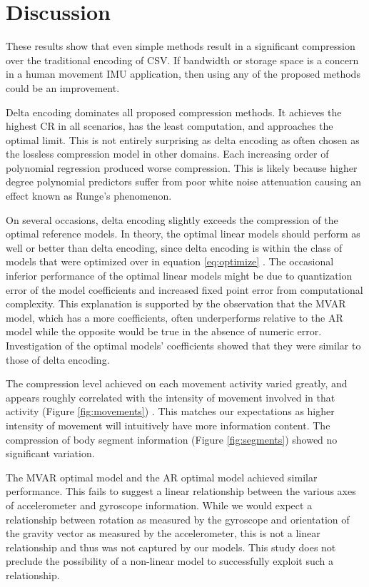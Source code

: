 \documentclass[journal]{IEEEtran}
\begin{document}
\section{Discussion}

These results show that even simple methods result in a significant compression over the traditional encoding of CSV. If bandwidth or storage space is a concern in a human movement IMU application, then using any of the proposed methods could be an improvement.

Delta encoding dominates all proposed compression methods. It achieves the highest CR in all scenarios, has the least computation, and approaches the optimal limit. This is not entirely surprising as delta encoding as often chosen as the lossless compression model in other domains\cite{Blalock2018}\cite{Coalson2008}. Each increasing order of polynomial regression produced worse compression. This is likely because higher degree polynomial predictors suffer from poor white noise attenuation \cite{Tanskanen2000} causing an effect known as Runge's phenomenon.

On several occasions, delta encoding slightly exceeds the compression of the optimal reference models. In theory, the optimal linear models should perform as well or better than delta encoding, since delta encoding is within the class of models that were optimized over in equation \eqref{eq:optimize} . The occasional inferior performance of the optimal linear models might be due to quantization error of the model coefficients and increased fixed point error from computational complexity. This explanation is supported by the observation that the MVAR model, which has a more coefficients, often underperforms relative to the AR model while the opposite would be true in the absence of numeric error. Investigation of the optimal models' coefficients showed that they were similar to those of delta encoding.

The compression level achieved on each movement activity varied greatly, and appears roughly correlated with the intensity of movement involved in that activity (Figure \ref{fig:movements}) . This matches our expectations as higher intensity of movement will intuitively have more information content. The compression of body segment information (Figure \ref{fig:segments}) showed no significant variation.

The MVAR optimal model and the AR optimal model achieved similar performance. This fails to suggest a linear relationship between the various axes of accelerometer and gyroscope information. While we would expect a relationship between rotation as measured by the gyroscope and orientation of the gravity vector as measured by the accelerometer, this is not a linear relationship and thus was not captured by our models. This study does not preclude the possibility of a non-linear model to successfully exploit such a relationship.
\end{document}
